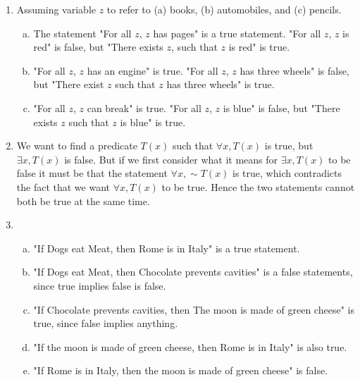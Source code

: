 \documentclass[a4paper, 11pt]{report}
\theoremstyle{plain}
\theoremstyle{definition}
\renewcommand{\neg}{{\sim}} %
\begin{document}
\begin{enumerate}
  \item Assuming variable $z$ to refer to (a) books, (b) automobiles, and (c) pencils.
    \begin{enumerate}[a)]
      \item The statement "For all $z$, $z$ has pages" is a true statement.
        "For all $z$, $z$ is red" is false, but "There exists $z$, such that
        $z$ is red" is true.
      \item "For all $z$, $z$ has an engine" is true. "For all $z$, $z$ has
        three wheels" is false, but "There exist $z$ such that $z$ has three
        wheels" is true.
      \item "For all $z$, $z$ can break" is true. "For all $z$, $z$ is blue" is
        false, but "There exists $z$ such that $z$ is blue" is true.
    \end{enumerate}

  \item We want to find a predicate $T(x)$ such that $\forall x, T(x)$ is true,
    but $\exists x, T(x)$ is false. But if we first consider what it means for
    $\exists x, T(x)$ to be false it must be that the statement $\forall x,
    \neg T(x)$ is true, which contradicts the fact that we want $\forall x, T(x)$ to be
    true. Hence the two statements cannot both be true at the same time.

  \item 
    \begin{enumerate}[a)]
      \item "If Dogs eat Meat, then Rome is in Italy" is a true statement.
      \item "If Dogs eat Meat, then Chocolate prevents cavities" is a false
        statements, since true implies false is false.
      \item "If Chocolate prevents cavities, then The moon is made of green
        cheese" is true, since false implies anything.
      \item "If the moon is made of green cheese, then Rome is in Italy" is
        also true. 
      \item "If Rome is in Italy, then the moon is made of green cheese" is
        false.
    \end{enumerate}


\end{enumerate}
\end{document}
